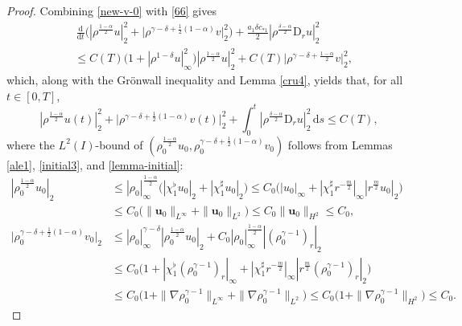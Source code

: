 \documentclass[11pt,reqno]{amsart}
\numberwithin{rk}{section}
\numberwithin{prop}{section}
\numberwithin{mydef}{section}
\numberwithin{lem}{section}
\numberwithin{equation}{section}
\numberwithin{thm}{section}
\begin{document}
\begin{proof}
Combining \eqref{new-v-0} with \eqref{66} gives
\begin{equation*} 
\begin{aligned}
&\,\frac{\mathrm{d}}{\mathrm{d}t}\big(|\rho^\frac{1-\alpha}{2}u|_2^2+\big|\rho^{\gamma-\delta+\frac{1}{2}(1-\alpha)}v\big|_2^2\big)+ \frac{a_1\delta c_{*1}}{2} |\rho^\frac{\delta-\alpha}{2}\mathrm{D}_r u|_2^2\\
&\leq C(T)\big(1+|\rho^{1-\delta}u|_\infty^2\big) |\rho^\frac{1-\alpha}{2}u|_2^2+C(T)\big|\rho^{\gamma-\delta+\frac{1-\alpha}{2}}v\big|_{2}^{2},
\end{aligned}
\end{equation*}
which, along with the Gr\"onwall inequality and Lemma \ref{cru4}, yields that, for all $t\in [0,T]$,
\begin{equation}\label{47-0}
|\rho^\frac{1-\alpha}{2}u(t)|_2^2+\big|\rho^{\gamma-\delta+\frac{1}{2}(1-\alpha)}v(t)\big|_2^2+ \int_0^t |\rho^\frac{\delta-\alpha}{2}\mathrm{D}_r u|_2^2\,\mathrm{d}s\leq  C(T),
\end{equation}
where the $L^2(I)$-bound of $(\rho_0^\frac{1-\alpha}{2}u_0,\rho_0^{\gamma-\delta+\frac{1}{2}(1-\alpha)}v_0)$ follows from Lemmas \ref{ale1}, \ref{initial3}, and \ref{lemma-initial}:
\begin{equation*}
\begin{aligned}
|\rho_0^\frac{1-\alpha}{2}u_0|_2&\leq |\rho_0|_\infty^\frac{1-\alpha}{2}\big(|\chi_1^\flat u_0|_2+|\chi_1^\sharp u_0|_2\big)\leq C_0\big(|u_0|_\infty+|\chi_1^\sharp r^{-\frac{m}{2}}|_\infty |r^\frac{m}{2}u_0|_2\big) \\
&\leq C_0\big(\|\boldsymbol{u}_0\|_{L^\infty}+\|\boldsymbol{u}_0\|_{L^2}\big)\leq C_0\|\boldsymbol{u}_0\|_{H^2}\leq C_0,\\
\big|\rho_0^{\gamma-\delta+\frac{1}{2}(1-\alpha)} v_0\big|_2&\leq |\rho_0|_\infty^{\gamma-\delta}|\rho_0^{\frac{1-\alpha}{2}}u_0|_2+C_0 |\rho_0|_\infty^\frac{1-\alpha}{2}|(\rho_0^{\gamma-1})_r|_2\\
&\leq C_0\big(1+|\chi_1^\flat(\rho_0^{\gamma-1})_r|_\infty+|\chi_1^\sharp r^{-\frac{m}{2}}|_\infty|r^\frac{m}{2}(\rho_0^{\gamma-1})_r|_2\big)\\
&\leq C_0 \big(1+\|\nabla\rho_0^{\gamma-1}\|_{L^\infty}+\|\nabla\rho_0^{\gamma-1}\|_{L^2}\big)\leq C_0\big(1+\|\nabla\rho_0^{\gamma-1}\|_{H^2}\big)\leq C_0.
\end{aligned}
\end{equation*}



\end{proof}
\end{document}
